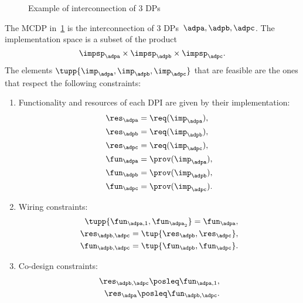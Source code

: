     \begin{figure}
        \centering
        \caption{Example of interconnection of 3 DPs}
        \label{fig:exampleq}
    \end{figure}
    \begin{example}
        The MCDP in~\cref{fig:exampleq} is the interconnection of 3
        DPs~$\adpa,\adpb,\adpc$.
        The implementation space is a subset of the product
        \begin{equation}
            \impsp_\adpa \times  \impsp_\adpb \times \impsp_\adpc.
        \end{equation}
        The elements $\tupp{\imp_\adpa, \imp_\adpb, \imp_\adpc}$ that are feasible
        are the ones that respect the following constraints:
        \begin{enumerate}
            \item Functionality and resources of each DPI are given by their implementation:
            \begin{align}
                \res_\adpa &= \req(\imp_\adpa), \\
                \res_\adpb &= \req(\imp_\adpb), \\
                \res_\adpc &= \req(\imp_\adpc), \\
                \fun_\adpa &= \prov(\imp_\adpa), \\
                \fun_\adpb &= \prov(\imp_\adpb), \\
                \fun_\adpc &= \prov(\imp_\adpc).
            \end{align}
            \item Wiring constraints:
            \begin{align}
                \tupp{\fun_{\adpa,1}, \fun_{\adpa_2}}  = \fun_\adpa, \\
                \res_{\adpb,\adpc}=\tup{\res_\adpb,\res_\adpc}, \\
                \fun_{\adpb,\adpc}=\tup{\fun_\adpb,\fun_\adpc}.
            \end{align}
            \item Co-design constraints:
            \begin{align}
                \res_{\adpb,\adpc}\posleq \fun_{\adpa,1},\\
                \res_\adpa \posleq \fun_{\adpb,\adpc}.
            \end{align}
        \end{enumerate}
    \end{example}

